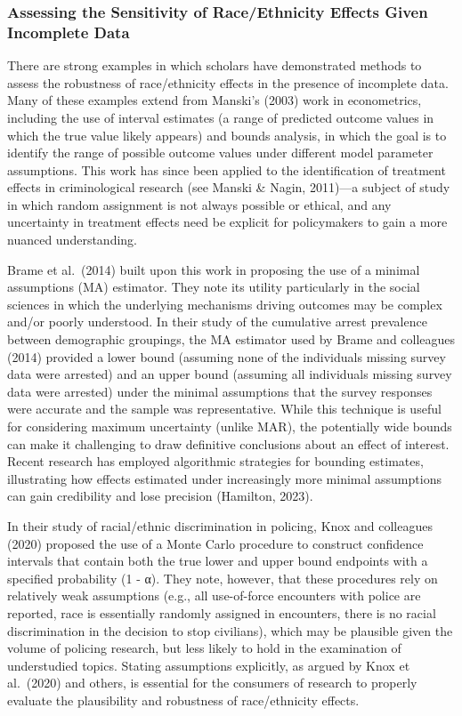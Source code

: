 \documentclass[
  letterpaper,
  DIV=11,
  numbers=noendperiod]{scrartcl}
\begin{document}
\hypertarget{assessing-the-sensitivity-of-raceethnicity-effects-given-incomplete-data}{%
\subsubsection{Assessing the Sensitivity of Race/Ethnicity Effects Given
Incomplete
Data}\label{assessing-the-sensitivity-of-raceethnicity-effects-given-incomplete-data}}

There are strong examples in which scholars have demonstrated methods to
assess the robustness of race/ethnicity effects in the presence of
incomplete data. Many of these examples extend from Manski's (2003) work
in econometrics, including the use of interval estimates (a range of
predicted outcome values in which the true value likely appears) and
bounds analysis, in which the goal is to identify the range of possible
outcome values under different model parameter assumptions. This work
has since been applied to the identification of treatment effects in
criminological research (see Manski \& Nagin, 2011)---a subject of study
in which random assignment is not always possible or ethical, and any
uncertainty in treatment effects need be explicit for policymakers to
gain a more nuanced understanding.

Brame et al.~(2014) built upon this work in proposing the use of a
minimal assumptions (MA) estimator. They note its utility particularly
in the social sciences in which the underlying mechanisms driving
outcomes may be complex and/or poorly understood. In their study of the
cumulative arrest prevalence between demographic groupings, the MA
estimator used by Brame and colleagues (2014) provided a lower bound
(assuming none of the individuals missing survey data were arrested) and
an upper bound (assuming all individuals missing survey data were
arrested) under the minimal assumptions that the survey responses were
accurate and the sample was representative. While this technique is
useful for considering maximum uncertainty (unlike MAR), the potentially
wide bounds can make it challenging to draw definitive conclusions about
an effect of interest. Recent research has employed algorithmic
strategies for bounding estimates, illustrating how effects estimated
under increasingly more minimal assumptions can gain credibility and
lose precision (Hamilton, 2023).

In their study of racial/ethnic discrimination in policing, Knox and
colleagues (2020) proposed the use of a Monte Carlo procedure to
construct confidence intervals that contain both the true lower and
upper bound endpoints with a specified probability (1 - α). They note,
however, that these procedures rely on relatively weak assumptions
(e.g., all use-of-force encounters with police are reported, race is
essentially randomly assigned in encounters, there is no racial
discrimination in the decision to stop civilians), which may be
plausible given the volume of policing research, but less likely to hold
in the examination of understudied topics. Stating assumptions
explicitly, as argued by Knox et al.~(2020) and others, is essential for
the consumers of research to properly evaluate the plausibility and
robustness of race/ethnicity effects.
\end{document}
